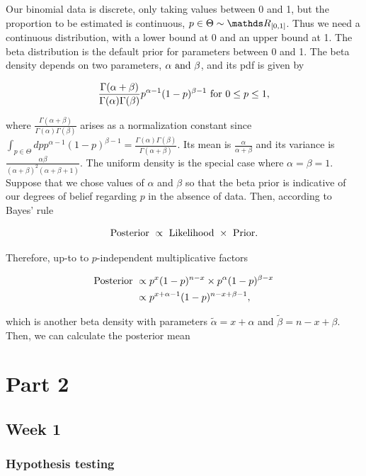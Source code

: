 \documentclass{homework}
\begin{document}
Our binomial data is discrete, only taking values between 0 and 1, but the proportion to be estimated is continuous, $p \in \Theta \sim \R_{[0,1]}$. Thus we need a continuous distribution, with a lower bound at 0 and an upper bound at 1. The beta distribution is the default prior for parameters between 0 and 1. The beta density depends on two parameters, $\alpha \textnormal{ and } \beta$, and its pdf is given by

$$
\frac{\Gamma(\alpha+\beta)}{\Gamma(\alpha)\Gamma(\beta)} p^{\alpha-1}(1-p)^{\beta-1} \textnormal{ for } 0 \leq p \leq 1,
$$

where $\frac{\Gamma(\alpha+\beta)}{\Gamma(\alpha)\Gamma(\beta)}$ arises as a normalization constant since $\int_{p\in\Theta}dp p^{\alpha-1}(1-p)^{\beta-1} = \frac{\Gamma(\alpha)\Gamma(\beta)}{\Gamma(\alpha+\beta)}$. Its mean is $\frac{\alpha}{\alpha+\beta}$ and its variance is $\frac{\alpha\beta}{(\alpha+\beta)^2(\alpha+\beta+1)}$. The uniform density is the special case where $\alpha=\beta=1$. \\

Suppose that we chose values of $\alpha$ and $\beta$ so that the beta prior is indicative of our degrees of belief regarding $p$ in the absence of data. Then, according to Bayes' rule

$$
\textnormal{Posterior } \propto \textnormal{ Likelihood  }\times \textnormal{ Prior}. 
$$

Therefore, up-to to $p$-independent multiplicative factors

\begin{align*}
    \textnormal{Posterior } &\propto p^{x}(1-p)^{n-x} \times p^{\alpha}(1-p)^{\beta-x} \\
    &\propto p^{x+\alpha-1}(1-p)^{n-x+\beta-1},
\end{align*}

which is another beta density with parameters $\tilde{\alpha}=x+\alpha$ and $\tilde{\beta}=n-x+\beta$.
Then, we can calculate the posterior mean

\clearpage

\section{Part 2}
\subsection{Week 1}

\subsubsection{Hypothesis testing}
\end{document}

